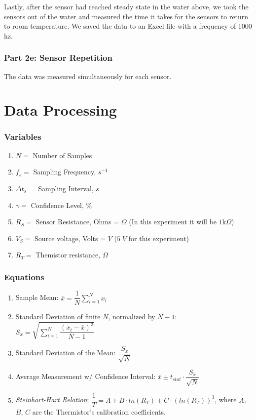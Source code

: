 \documentclass{article}
\begin{document}
Lastly, after the sensor had reached steady state in the water above, we took the sensors out of the water and measured the time it takes for the sensors to return to room temperature. We saved the data to an Excel file with a frequency of 1000 hz. 

\subsubsection{Part 2e: Sensor Repetition} %

The data was measured simultaneously for each sensor.  

\section{Data Processing}
\subsubsection*{Variables}
\begin{enumerate}[label = \roman*.]
    \item \(N = \) Number of Samples
    \item \(f_{s} = \) Sampling Frequency, $s^{-1}$
    \item \(\Delta t_{s} = \) Sampling Interval, $s$
    \item \(\gamma = \) Confidence Level, \%
    \item \(R_{S} = \) Sensor Resistance, Ohms = $\Omega$ (In this experiment it will be $1\text{k}\Omega$)
    \item \(V_{S} = \) Source voltage, Volts = $V$ ($5\;V$ for this experiment)
    \item \(R_{T} = \) Themistor resistance, $\Omega$
\end{enumerate}

\subsubsection*{Equations}
\begin{enumerate}[label = \Roman*.]
    \item Sample Mean: \(\bar{x} = \dfrac{1}{N}\displaystyle\sum_{i=1}^{N} x_{i}\) 
    \item Standard Deviation of finite $N$, normalized by $N-1$: \(S_{x} = \sqrt{\displaystyle\sum_{i=1}^{N} \dfrac{(x_{i} - \bar{x})^{2}}{N-1}}\)
    \item Standard Deviation of the Mean: \(\dfrac{S_{x}}{\sqrt{N}}\)
    \item Average Measurement w/ Confidence Interval: \(\bar{x} \pm t_{stat}\cdot \dfrac{S_{x}}{\sqrt{N}}\)
    \item \textit{Steinhart-Hart Relation}: \(\dfrac{1}{T} = A + B\cdot ln(R_{T}) + C\cdot (ln(R_{T}))^{3}\), where $A$, $B$, $C$ are the Thermistor's calibration coefficients.
\end{enumerate}  
\end{document}
